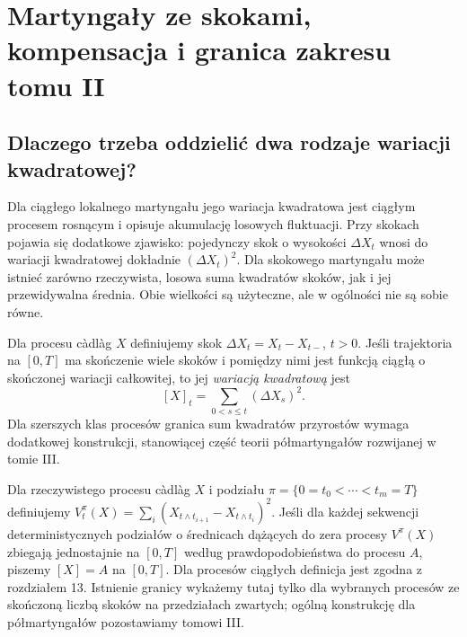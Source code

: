 \chapter{Martyngały ze skokami, kompensacja i granica zakresu tomu II}
\label{ch:jump-mart}

\section{Dlaczego trzeba oddzielić dwa rodzaje wariacji kwadratowej?}
Dla ciągłego lokalnego martyngału jego wariacja kwadratowa
jest ciągłym procesem rosnącym i opisuje akumulację
losowych fluktuacji. Przy skokach pojawia się dodatkowe
zjawisko: pojedynczy skok o wysokości $\Delta X_t$
wnosi do wariacji kwadratowej dokładnie $(\Delta X_t)^2$.
Dla skokowego martyngału może istnieć zarówno rzeczywista,
losowa suma kwadratów skoków, jak i jej przewidywalna
średnia. Obie wielkości są użyteczne, ale w ogólności
nie są sobie równe.

\begin{definicja}
Dla procesu c\`adl\`ag $X$ definiujemy skok
$\Delta X_t=X_t-X_{t-}$, $t>0$. Jeśli trajektoria
na $[0,T]$ ma skończenie wiele skoków i pomiędzy nimi
jest funkcją ciągłą o skończonej wariacji całkowitej,
to jej \emph{wariacją kwadratową} jest
\[
[X]_t=\sum_{0<s\le t}(\Delta X_s)^2.
\]
Dla szerszych klas procesów granica sum kwadratów
przyrostów wymaga dodatkowej konstrukcji, stanowiącej
część teorii półmartyngałów rozwijanej w tomie III.
\end{definicja}


\begin{definicja}
Dla rzeczywistego procesu c\`adl\`ag $X$ i podziału
$\pi=\{0=t_0<\cdots<t_m=T\}$ definiujemy
$V_t^\pi(X)=\sum_i(X_{t\wedge t_{i+1}}-X_{t\wedge t_i})^2$.
Jeśli dla każdej sekwencji deterministycznych podziałów o
średnicach dążących do zera procesy $V^\pi(X)$ zbiegają
jednostajnie na $[0,T]$ według prawdopodobieństwa do
procesu $A$, piszemy $[X]=A$ na $[0,T]$.
Dla procesów ciągłych definicja jest zgodna z rozdziałem 13.
Istnienie granicy wykażemy tutaj tylko dla wybranych procesów
ze skończoną liczbą skoków na przedziałach zwartych;
ogólną konstrukcję dla półmartyngałów pozostawiamy tomowi III.
\end{definicja}

